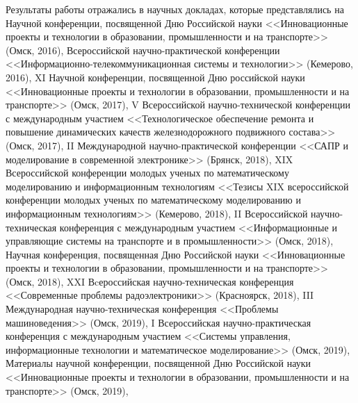 
{\probation}
Результаты работы отражались в научных докладах, которые представлялись на Научной конференции, посвященной Дню Российской науки <<Инновационные проекты и технологии в образовании, промышленности и на транспорте>> (Омск, 2016),
Всероссийской научно-практической конференции <<Информационно-телекоммуникационная системы и технологии>>
(Кемерово, 2016),
XI Научной конференции, посвященной Дню российской науки <<Инновационные проекты и технологии в образовании, промышленности и на транспорте>> (Омск, 2017),
V Всероссийской научно-технической конференции с международным участием <<Технологическое обеспечение ремонта и повышение динамических качеств железнодорожного подвижного состава>> (Омск, 2017),
II Международной научно-практической конференции  <<САПР и моделирование в современной электронике>> (Брянск, 2018),
XIX Всероссийской конференции молодых ученых по математическому моделированию и информационным технологиям <<Тезисы XIX всероссийской конференции молодых ученых  по математическому моделированию и информационным технологиям>> (Кемерово, 2018),
II Всероссийской научно-техническая конференция с международным участием <<Информационные и управляющие системы на транспорте и в промышленности>> (Омск, 2018),
Научная конференция, посвященная Дню Российской науки <<Инновационные проекты и технологии в образовании, промышленности и на транспорте>> (Омск, 2018),
XXI Вcероссийская научно-техническая конференция <<Современные проблемы радоэлектроники>> (Красноярск, 2018),
III Международная научно-техническая конференция <<Проблемы машиноведения>> (Омск, 2019),
I Всероссийская научно-практическая конференция с международным участием <<Системы управления, информационные технологии и математическое моделирование>> (Омск, 2019),
Материалы научной конференции, посвященной Дню Российской науки <<Инновационные проекты и технологии в образовании, промышленности и на транспорте>> (Омск, 2019),
